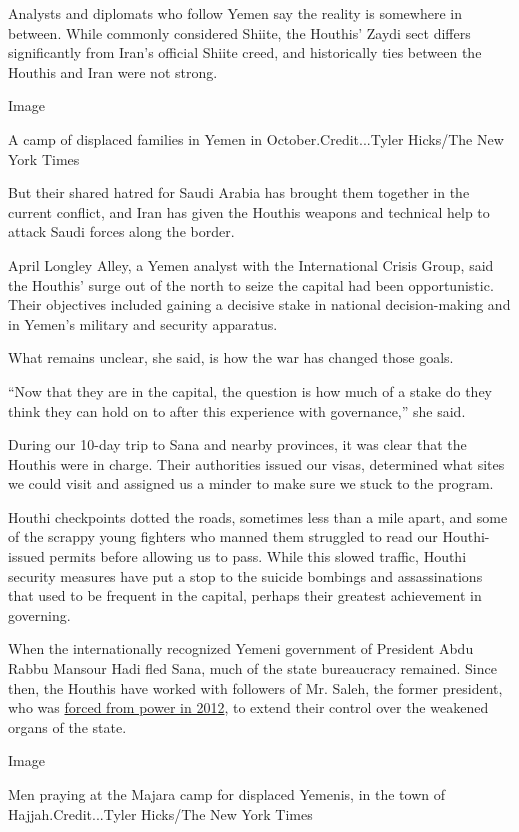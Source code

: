 Analysts and diplomats who follow Yemen say the reality is somewhere in
between. While commonly considered Shiite, the Houthis' Zaydi sect
differs significantly from Iran's official Shiite creed, and
historically ties between the Houthis and Iran were not strong.

Image

A camp of displaced families in Yemen in October.Credit...Tyler
Hicks/The New York Times

But their shared hatred for Saudi Arabia has brought them together in
the current conflict, and Iran has given the Houthis weapons and
technical help to attack Saudi forces along the border.

April Longley Alley, a Yemen analyst with the International Crisis
Group, said the Houthis' surge out of the north to seize the capital had
been opportunistic. Their objectives included gaining a decisive stake
in national decision-making and in Yemen's military and security
apparatus.

What remains unclear, she said, is how the war has changed those goals.

``Now that they are in the capital, the question is how much of a stake
do they think they can hold on to after this experience with
governance,'' she said.

During our 10-day trip to Sana and nearby provinces, it was clear that
the Houthis were in charge. Their authorities issued our visas,
determined what sites we could visit and assigned us a minder to make
sure we stuck to the program.

Houthi checkpoints dotted the roads, sometimes less than a mile apart,
and some of the scrappy young fighters who manned them struggled to read
our Houthi-issued permits before allowing us to pass. While this slowed
traffic, Houthi security measures have put a stop to the suicide
bombings and assassinations that used to be frequent in the capital,
perhaps their greatest achievement in governing.

When the internationally recognized Yemeni government of President Abdu
Rabbu Mansour Hadi fled Sana, much of the state bureaucracy remained.
Since then, the Houthis have worked with followers of Mr. Saleh, the
former president, who was
\href{http://www.nytimes.com/2012/02/22/world/middleeast/yemen-votes-to-remove-ali-abdullah-saleh.html}{forced
from power in 2012}, to extend their control over the weakened organs of
the state.

Image

Men praying at the Majara camp for displaced Yemenis, in the town of
Hajjah.Credit...Tyler Hicks/The New York Times

